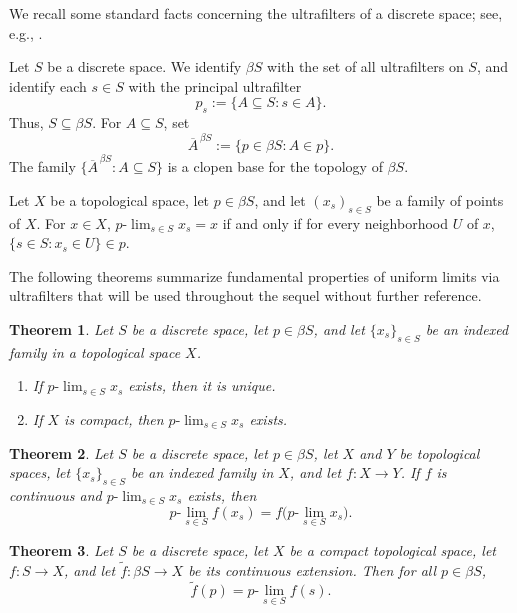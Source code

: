 \documentclass[11pt]{amsart}
\newtheorem{theorem}{Theorem}[section]
\theoremstyle{definition}
\theoremstyle{remark}
\begin{document}
 
We recall some standard facts concerning the ultrafilters of a discrete space; see, e.g., \cite[Chapters~3--4]{HindmanStrauss2012}.

Let $S$ be a discrete space.  We identify $\beta S$ with the set of all ultrafilters on $S$, and identify each $s\in S$ with the principal ultrafilter
\[
p_s:=\{A\subseteq S:s\in A\}.
\]
Thus, $S\subseteq\beta S$.  For $A\subseteq S$, set
\[
\overline{A}^{\,\beta S}:=\{p\in\beta S:A\in p\}.
\]
The family $\bigl\{\overline{A}^{\,\beta S}:A\subseteq S\bigr\}$
is a clopen base for the topology of $\beta S$.

Let $X$ be a topological space, let $p\in\beta S$, and let
$(x_s)_{s\in S}$ be a family of points of $X$.  For $x\in X$, $p\text{-}\lim_{s\in S}x_s=x$ 
if and only if for every neighborhood $U$ of $x$, $\{s\in S:x_s\in U\}\in p$.

 The following theorems summarize fundamental properties of  uniform limits via ultrafilters that will be used throughout the sequel without further reference.

\begin{theorem}\label{thm:ultralimit-basic} \cite{HindmanStrauss2012}
Let $S$ be a discrete space, let $p \in \beta S$, and let $\{x_s\}_{s \in S}$ be an indexed family in a topological space $X$.
\begin{enumerate}
  \item If $ p\text{-}\lim_{s\in S}x_s$ exists, then it is unique.
  \item If $X$ is compact, then $p\text{-}\lim_{s\in S}x_s $ exists.
\end{enumerate}
\end{theorem}


\begin{theorem}\label{thm:ultralimit-continuous}\cite{HindmanStrauss2012}
Let $S$ be a discrete space, let $p \in \beta S$, let $X$ and $Y$ be topological spaces, let $\{x_s\}_{s \in S}$ be an indexed family in $X$, and let $f \colon X \to Y$. If $f$ is continuous and $p\text{-}\lim_{s\in S}x_s $ exists, then
\[
   p\text{-}\lim_{s\in S} f(x_s) = f\bigl( p\text{-}\lim_{s\in S}x_s  \bigr).
\]
\end{theorem}


\begin{theorem}\cite{HindmanStrauss2012}
Let $S$ be a discrete space, let $X$ be a compact topological  space, let $f \colon S \to X$, and let $\tilde{f} \colon \beta S \to X$ be its continuous extension. Then for all $p \in \beta S$,
\[
  \tilde{f}(p) = p\text{-}\lim_{s\in S}  f(s).
\]
\end{theorem}
\end{document}
